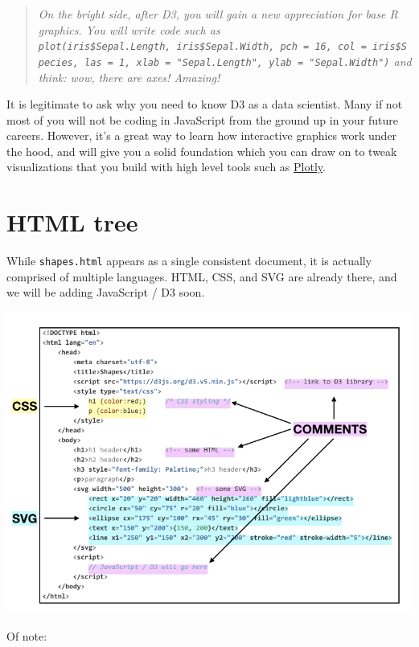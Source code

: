\documentclass[
  openany]{book}
\begin{document}
\begin{quote}
\emph{On the bright side, after D3, you will gain a new appreciation for base R graphics. You will write code such as \texttt{plot(iris\$Sepal.Length,\ iris\$Sepal.Width,\ pch\ =\ 16,\ col\ =\ iris\$Species,\ las\ =\ 1,\ xlab\ =\ "Sepal.Length",\ ylab\ =\ "Sepal.Width")} and think: wow, there are axes! Amazing!}
\end{quote}

It is legitimate to ask why you need to know D3 as a data scientist. Many if not most of you will not be coding in JavaScript from the ground up in your future careers. However, it's a great way to learn how interactive graphics work under the hood, and will give you a solid foundation which you can draw on to tweak visualizations that you build with high level tools such as \href{https://plot.ly/}{Plotly}.

\hypertarget{html-tree}{%
\section{\texorpdfstring{HTML tree }{HTML tree }}\label{html-tree}}

While \texttt{shapes.html} appears as a single consistent document, it is actually comprised of multiple languages. HTML, CSS, and SVG are already there, and we will be adding JavaScript / D3 soon.

\begin{center}\includegraphics[width=1\linewidth]{images/shapes} \end{center}

Of note:
\end{document}
